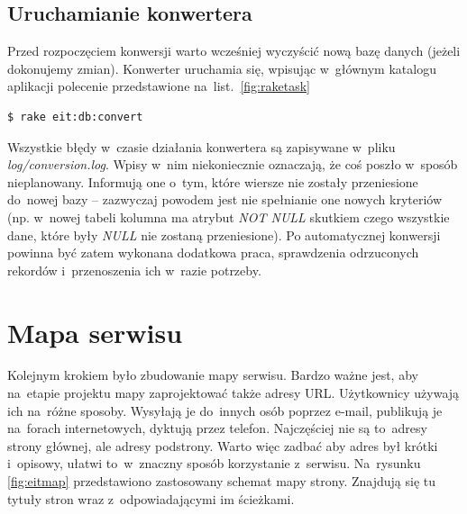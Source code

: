 \documentclass[a4paper,12pt,oneside]{report}
\begin{document}
\subsection{Uruchamianie konwertera}
\label{sub:conv-run}

Przed rozpoczęciem konwersji warto wcześniej wyczyścić nową bazę danych (jeżeli dokonujemy zmian). Konwerter uruchamia się, wpisując w~głównym katalogu aplikacji polecenie przedstawione na~list.~\ref{fig:raketask}

\begin{lstlisting}[caption={Polecenie wykonujące konwersję baz danych},label=fig:raketask,captionpos=b]
$ rake eit:db:convert
\end{lstlisting}

Wszystkie błędy w~czasie działania konwertera są zapisywane w~pliku \emph{log/conversion.log}. Wpisy w~nim niekoniecznie oznaczają, że coś poszło w~sposób nieplanowany. Informują one o~tym, które wiersze nie zostały przeniesione do~nowej bazy -- zazwyczaj powodem jest nie spełnianie one nowych kryteriów (np. w~nowej tabeli kolumna ma atrybut \emph{NOT NULL} skutkiem czego wszystkie dane, które były \emph{NULL} nie zostaną przeniesione). Po automatycznej konwersji powinna być zatem wykonana dodatkowa praca, sprawdzenia odrzuconych rekordów i~przenoszenia ich w~razie potrzeby.

\section{Mapa serwisu}
\label{sec:mapa}
Kolejnym krokiem było zbudowanie mapy serwisu. Bardzo ważne jest, aby na~etapie projektu mapy zaprojektować także adresy URL. Użytkownicy używają ich na~różne sposoby. Wysyłają je do~innych osób poprzez e-mail, publikują je na~forach internetowych, dyktują przez telefon. Najczęściej nie są to~adresy strony głównej, ale adresy podstrony. Warto więc zadbać aby adres był krótki i~opisowy, ułatwi to~w~znaczny sposób korzystanie z~serwisu. Na~rysunku \ref{fig:eitmap} przedstawiono zastosowany schemat mapy strony. Znajdują się tu tytuły stron wraz z~odpowiadającymi im ścieżkami.
\end{document}
